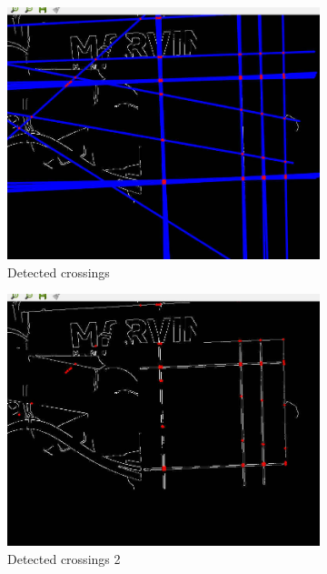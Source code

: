 \begin{figure}[ht!]
	\begin{subfigure}{.49\textwidth}
		\centering
		\includegraphics[width=\textwidth]{figures/lines4}
	\caption{Detected crossings}
	\label{fig:l4}
	\end{subfigure}
		\begin{subfigure}{.49\textwidth}
		\centering
		\includegraphics[width=\textwidth]{figures/lines5}
	\caption{Detected crossings 2}
	\label{fig:l5}
	\end{subfigure}
	\begin{subfigure}{\textwidth}

\end{subfigure}
\end{figure}
